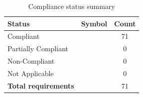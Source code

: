 %

\begin{table}[H]
    \centering
    \caption{Compliance status summary}
    \label{tab:moc_summary}
    \begin{tabular}{lcc}
        \toprule
        \textbf{Status} & \textbf{Symbol} & \textbf{Count} \\
        \midrule
        Compliant             & \compliant{}       & 71 \\
        Partially Compliant   & \partlycompliant{} & 0 \\
        Non-Compliant         & \noncompliant{}    & 0 \\
        Not Applicable        & \notapplicable{}   & 0 \\
        \midrule
        \textbf{Total requirements} &              & 71 \\
        \bottomrule
    \end{tabular}
\end{table}

